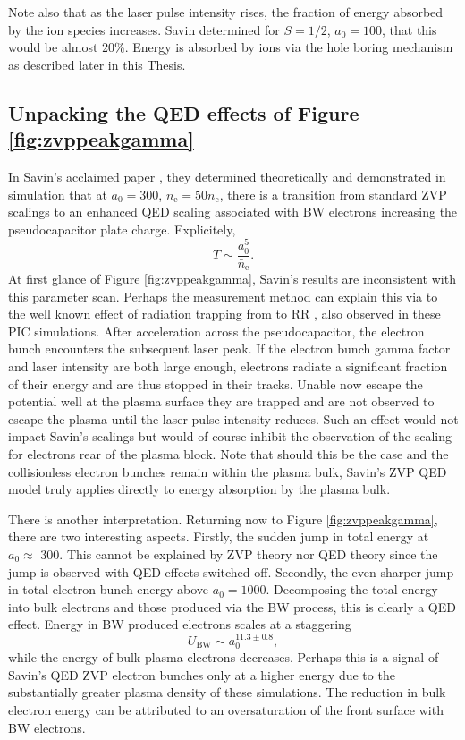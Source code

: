 Note also that as the laser pulse intensity rises, the fraction of energy absorbed by the ion species increases. Savin \cite{savinModellingLaserPlasmaInteractions2019} determined for $S=1/2$, $a_0 = 100$, that this would be almost 20\%. Energy is absorbed by ions via the hole boring mechanism as described later in this Thesis.

\subsection{Unpacking the QED effects of Figure \ref{fig:zvppeakgamma}}
In Savin's acclaimed paper \cite{savinEnergyAbsorptionLaserQED2019}, they determined theoretically and demonstrated in simulation that at $a_0 = 300$, $n_\mathrm{e} = 50 n_\mathrm{c}$, there is a transition from standard ZVP scalings to an enhanced QED scaling associated with \ac{BW} electrons increasing the pseudocapacitor plate charge. Explicitely,
\begin{equation}
	T \sim \frac{a^5_0}{\bar{n}_\mathrm{e}}.
\end{equation}
At first glance of Figure \ref{fig:zvppeakgamma}, Savin's results are inconsistent with this parameter scan. Perhaps the measurement method can explain this via to the well known effect of radiation trapping from to \ac{RR} \cite{jiRadiationReactionTrappingElectrons2014}, also observed in these PIC simulations. After acceleration across the pseudocapacitor, the electron bunch encounters the subsequent laser peak. If the electron bunch gamma factor and laser intensity are both large enough, electrons radiate a significant fraction of their energy and are thus stopped in their tracks. Unable now escape the potential well at the plasma surface they are trapped and are not observed to escape the plasma until the laser pulse intensity reduces. Such an effect would not impact Savin's scalings but would of course inhibit the observation of the scaling for electrons rear of the plasma block. Note that should this be the case and the collisionless electron bunches remain within the plasma bulk, Savin's ZVP QED model truly applies directly to energy absorption by the plasma bulk.

There is another interpretation. Returning now to Figure \ref{fig:zvppeakgamma}, there are two interesting aspects. Firstly, the sudden jump in total energy at $a_0 \approx$ 300. This cannot be explained by ZVP theory nor QED theory since the jump is observed with QED effects switched off. Secondly, the even sharper jump in total electron bunch energy above $a_0 = 1000$. Decomposing the total energy into bulk electrons and those produced via the BW process, this is clearly a QED effect. Energy in BW produced electrons scales at a staggering
\begin{equation}
	U_\mathrm{BW} \sim a^{11.3\pm 0.8}_0,
\end{equation}
while the energy of bulk plasma electrons decreases. Perhaps this is a signal of Savin's QED ZVP electron bunches only at a higher energy due to the substantially greater plasma density of these simulations. The reduction in bulk electron energy can be attributed to an oversaturation of the front surface with BW electrons.

